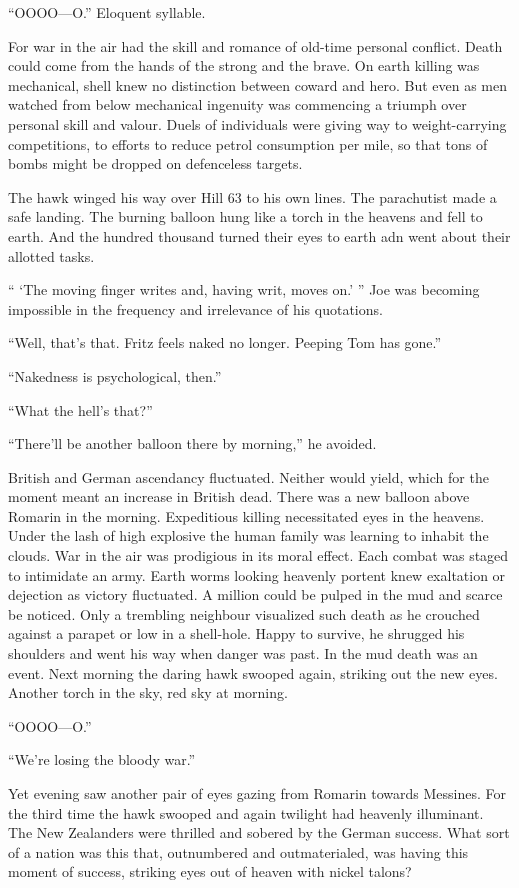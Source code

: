 ``OOOO---O.'' Eloquent syllable.

For war in the air had the skill and romance of old-time personal conflict. Death could come from the hands of the strong and the brave. On earth killing was mechanical, shell knew no distinction between coward and hero. But even as men watched from below mechanical ingenuity was commencing a triumph over personal skill and valour. Duels of individuals were giving way to weight-carrying competitions, to efforts to reduce petrol consumption per mile, so that tons of bombs might be dropped on defenceless targets.

The hawk winged his way over Hill 63 to his own lines. The parachutist made a safe landing. The burning balloon hung like a torch in the heavens and fell to earth. And the hundred thousand turned their eyes to earth adn went about their allotted tasks.

`` `The moving finger writes and, having writ, moves on.' '' Joe was becoming impossible in the frequency and irrelevance of his quotations.

``Well, that's that. Fritz feels naked no longer. Peeping Tom has gone.''

``Nakedness is psychological, then.''

``What the hell's that?''

``There'll be another balloon there by morning,'' he avoided.

British and German ascendancy fluctuated. Neither would yield, which for the moment meant an increase in British dead. There was a new balloon above Romarin in the morning. Expeditious killing necessitated eyes in the heavens. Under the lash of high explosive the human family was learning to inhabit the clouds. War in the air was prodigious in its moral effect. Each combat was staged to intimidate an army. Earth worms looking heavenly portent knew exaltation or dejection as victory fluctuated. A million could be pulped in the mud and scarce be noticed. Only a trembling neighbour visualized such death as he crouched against a parapet or low in a shell-hole. Happy to survive, he shrugged his shoulders and went his way when danger was past. In the mud death was an event. Next morning the daring hawk swooped again, striking out the new eyes. Another torch in the sky, red sky at morning.

``OOOO---O.''

``We're losing the bloody war.''

Yet evening saw another pair of eyes gazing from Romarin towards Messines. For the third time the hawk swooped and again twilight had heavenly illuminant. The New Zealanders were thrilled and sobered by the German success. What sort of a nation was this that, outnumbered and outmaterialed, was having this moment of success, striking eyes out of heaven with nickel talons?

